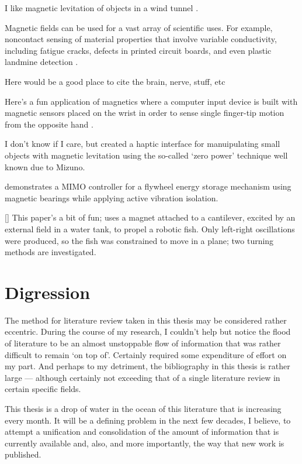 I like magnetic levitation of objects in a wind tunnel
\cite{higuchi2008}.

Magnetic fields can be used for a vast array of scientific uses. For example,
noncontact sensing of material properties that involve variable conductivity,
including fatigue cracks, defects in printed circuit boards, and even plastic
landmine detection \cite{mukhopadhyay2005}.

Here would be a good place to cite the brain, nerve, stuff, etc
\parencite{lu2008,demachi2008}


Here's a fun application of magnetics where a computer input device is built
with magnetic sensors placed on the wrist in order to sense single finger-tip
motion from the opposite hand \parencite{han2008}.

I don't know if I care, but \textcite{vanwest2007} created a
haptic interface for manuipulating small objects with magnetic
levitation using the so-called `zero power' technique well
known due to Mizuno.

\textcite{park2008} demonstrates a MIMO controller for a flywheel energy
storage mechanism using magnetic bearings while applying active vibration
isolation.

[\textcite{tomie2005}] This paper's a bit of fun; uses a magnet attached
to a cantilever, excited by an external field in a water tank, to propel a
robotic fish. Only left-right oscillations were produced, so the fish was
constrained to move in a plane; two turning methods are investigated.




\section{Digression}

The method for literature review taken in this thesis may be considered rather
eccentric. During the course of my research, I couldn't help but notice the
flood of literature to be an almost unstoppable flow of information that was
rather difficult to remain `on top of'. Certainly required some expenditure of
effort on my part. And perhaps to my detriment, the bibliography in this
thesis is rather large — although certainly not exceeding that of a single
literature review in certain specific fields.

This thesis is a drop of water in the ocean of this literature that is
increasing every month. It will be a defining problem in the next few decades,
I believe, to attempt a unification and consolidation of the amount of
information that is currently available and, also, and more importantly, the
way that new work is published.

